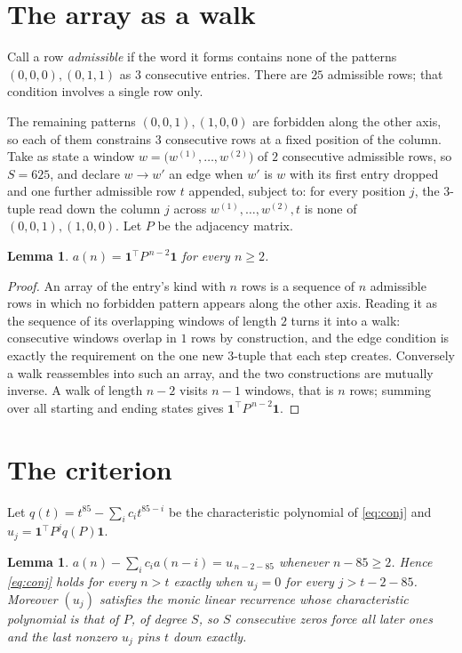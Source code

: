 \documentclass[11pt,a4paper]{article}
\theoremstyle{plain}
\newtheorem{lemma}[theorem]{Lemma}
\theoremstyle{definition}
\begin{document}
\section{The array as a walk}

Call a row \emph{admissible} if the word it forms contains none of the patterns
$(0,0,0), (0,1,1)$ as $3$ consecutive entries. There are $25$ admissible rows; that condition
involves a single row only.

The remaining patterns $(0,0,1), (1,0,0)$ are forbidden along the other axis, so each of them
constrains $3$ consecutive rows at a fixed position of the column. Take as state a
window $w=\bigl(w^{(1)},\dots,w^{(2)}\bigr)$ of $2$ consecutive admissible
rows, so $S=625$, and declare $w\to w'$ an edge when $w'$ is $w$ with its first entry
dropped and one further admissible row $t$ appended, subject to: for every position
$j$, the $3$-tuple read down the column $j$ across $w^{(1)},\dots,w^{(2)},t$
is none of $(0,0,1), (1,0,0)$. Let $P$ be the adjacency matrix.

\begin{lemma}\label{lem:walk}
$a(n)=\mathbf{1}^{\!\top}P^{\,n-2}\mathbf{1}$ for every $n\ge2$.
\end{lemma}

\begin{proof}
An array of the entry's kind with $n$ rows is a sequence of $n$ admissible rows in
which no forbidden pattern appears along the other axis. Reading it as the sequence of its
overlapping windows of length $2$ turns it into a walk: consecutive windows overlap in
$1$ rows by construction, and the edge condition is exactly the requirement on the one
new $3$-tuple that each step creates. Conversely a walk reassembles into such an array,
and the two constructions are mutually inverse. A walk of length $n-2$ visits $n-1$
windows, that is $n$ rows; summing over all starting and ending states gives
$\mathbf{1}^{\!\top}P^{\,n-2}\mathbf{1}$.
\end{proof}

\section{The criterion}

Let $q(t)=t^{85}-\sum_i c_i t^{85-i}$ be the characteristic polynomial of
\eqref{eq:conj} and $u_j=\mathbf{1}^{\!\top}P^{j}q(P)\mathbf{1}$.

\begin{lemma}\label{lem:crit}
$a(n)-\sum_i c_i a(n-i)=u_{\,n-2-85}$ whenever $n-85\ge2$. Hence
\eqref{eq:conj} holds for every $n>t$ exactly when $u_j=0$ for every
$j>t-2-85$. Moreover $(u_j)$ satisfies the monic linear recurrence whose
characteristic polynomial is that of $P$, of degree $S$, so $S$ consecutive zeros force all
later ones and the last nonzero $u_j$ pins $t$ down exactly.
\end{lemma}
\end{document}

